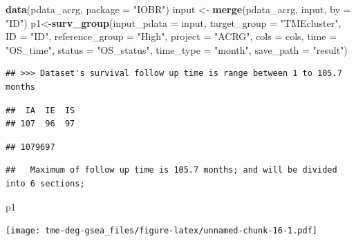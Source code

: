 \documentclass[
  12pt,
]{book}
\newenvironment{Shaded}{\begin{snugshade}}{\end{snugshade}}
\newcommand{\AttributeTok}[1]{\textcolor[rgb]{0.13,0.29,0.53}{#1}}
\newcommand{\FunctionTok}[1]{\textcolor[rgb]{0.13,0.29,0.53}{\textbf{#1}}}
\newcommand{\NormalTok}[1]{#1}
\newcommand{\OtherTok}[1]{\textcolor[rgb]{0.56,0.35,0.01}{#1}}
\newcommand{\StringTok}[1]{\textcolor[rgb]{0.31,0.60,0.02}{#1}}
\begin{document}
\begin{Shaded}
\begin{Highlighting}[]
\FunctionTok{data}\NormalTok{(pdata\_acrg, }\AttributeTok{package =} \StringTok{"IOBR"}\NormalTok{)}
\NormalTok{input }\OtherTok{\textless{}{-}} \FunctionTok{merge}\NormalTok{(pdata\_acrg, input, }\AttributeTok{by =} \StringTok{"ID"}\NormalTok{)}
\NormalTok{p1}\OtherTok{\textless{}{-}}\FunctionTok{surv\_group}\NormalTok{(}\AttributeTok{input\_pdata       =}\NormalTok{ input,}
               \AttributeTok{target\_group      =} \StringTok{"TMEcluster"}\NormalTok{,}
               \AttributeTok{ID                =} \StringTok{"ID"}\NormalTok{,}
               \AttributeTok{reference\_group   =} \StringTok{"High"}\NormalTok{,}
               \AttributeTok{project           =} \StringTok{"ACRG"}\NormalTok{,}
               \AttributeTok{cols              =}\NormalTok{ cols, }
               \AttributeTok{time              =} \StringTok{"OS\_time"}\NormalTok{,}
               \AttributeTok{status            =} \StringTok{"OS\_status"}\NormalTok{,}
               \AttributeTok{time\_type         =} \StringTok{"month"}\NormalTok{,}
               \AttributeTok{save\_path         =} \StringTok{"result"}\NormalTok{)}
\end{Highlighting}
\end{Shaded}

\begin{verbatim}
## >>> Dataset's survival follow up time is range between 1 to 105.7 months
\end{verbatim}

\begin{verbatim}
##  IA  IE  IS 
## 107  96  97
\end{verbatim}

\begin{verbatim}
## 1079697
\end{verbatim}

\begin{verbatim}
##   Maximum of follow up time is 105.7 months; and will be divided into 6 sections;
\end{verbatim}

\begin{Shaded}
\begin{Highlighting}[]
\NormalTok{p1}
\end{Highlighting}
\end{Shaded}

\texttt{[image: tme-deg-gsea\_files/figure-latex/unnamed-chunk-16-1.pdf]}
\end{document}
